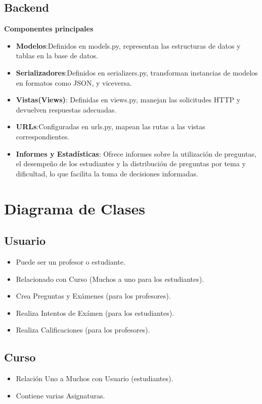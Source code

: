 \documentclass[a4paper,12pt]{article}
\begin{document}
\subsection{Backend}

\textbf{Componentes principales}
\begin{itemize}
	
	\item \textbf{Modelos}:Definidos en models.py, representan las estructuras de datos y tablas en la base de datos.
	\item \textbf{Serializadores}:Definidos en serializers.py, transforman instancias de modelos en formatos como JSON, y viceversa.
	\item \textbf{Vistas(Views)}: Definidas en views.py, manejan las solicitudes HTTP y devuelven respuestas adecuadas.
		\item \textbf{URLs}:Configuradas en urls.py, mapean las rutas a las vistas correspondientes.
	\item \textbf{Informes y Estadísticas}: Ofrece informes sobre la utilización de preguntas, el desempeño de los estudiantes y la distribución de preguntas por tema y dificultad, lo que facilita la toma de decisiones informadas.
\end{itemize}




\section{Diagrama de Clases}
\subsection{Usuario}
\begin{itemize}
    \item Puede ser un profesor o estudiante.
    \item Relacionado con Curso (Muchos a uno para los estudiantes).
	\item Crea Preguntas y Exámenes (para los profesores).
	\item Realiza Intentos de Exámen (para los estudiantes).
	\item Realiza Calificaciones (para los profesores).
\end{itemize}

\subsection{Curso}
\begin{itemize}
	\item Relación Uno a Muchos con Usuario (estudiantes).
	\item Contiene varias Asignaturas.
\end{itemize}
\end{document}
